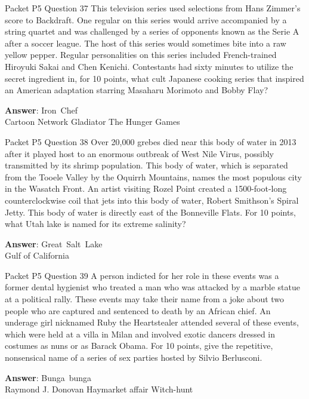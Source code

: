 \begin{frame}{Packet P5 Question 37}
This television series   used selections from Hans Zimmer’s score   to Backdraft. One regular on this series would arrive accompanied by a string quartet and was challenged by a series of opponents known as the Serie A after a soccer league. The host of this series would sometimes bite into a raw yellow pepper. Regular personalities on this series included French-trained Hiroyuki Sakai and Chen Kenichi. Contestants had sixty minutes to utilize the secret ingredient in, for 10 points, what cult Japanese cooking series that   inspired an American adaptation starring Masaharu Morimoto and Bobby Flay?  

\textbf{Answer}: Iron\ Chef\\
 Cartoon Network
 Gladiator
 The Hunger Games
\end{frame}

\begin{frame}{Packet P5 Question 38}
Over 20,000 grebes died near this body of water in 2013 after it played host to an enormous outbreak of West Nile Virus, possibly transmitted by its shrimp population. This body of water, which is separated from the Tooele Valley by the Oquirrh Mountains, names the most populous city in the Wasatch Front.   An artist visiting Rozel Point created   a 1500-foot-long counterclockwise coil that jets into this body of water, Robert Smithson's Spiral Jetty. This body of water is directly east of the Bonneville Flats. For 10 points, what Utah lake   is named for its extreme salinity?  

\textbf{Answer}: Great\ Salt\ Lake\\
 Gulf of California
\end{frame}

\begin{frame}{Packet P5 Question 39}
A person indicted for   her role in these events was a former dental hygienist who treated a man who was attacked by a marble statue at a political rally. These events   may take their name from a joke about two people who are captured and sentenced to death by an African chief. An underage girl nicknamed Ruby the Heartstealer   attended several of these events, which were held at a villa in Milan and involved   exotic dancers dressed in costumes   as nuns or as Barack Obama. For 10 points, give the repetitive, nonsensical name of a series of sex parties hosted by Silvio Berlusconi.  

\textbf{Answer}: Bunga\ bunga\\
 Raymond J. Donovan
 Haymarket affair
 Witch-hunt
\end{frame}

